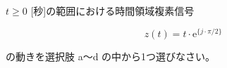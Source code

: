$t \ge 0$ [秒]の範囲における時間領域複素信号 

\[
z(t) = t \cdot \textrm{e}^{\{j \cdot \pi/2 \}}
\]

\medskip
\noindent の動きを選択肢 a〜d の中から1つ選びなさい。
